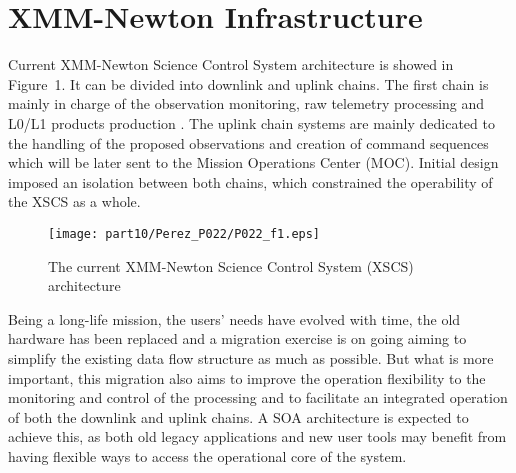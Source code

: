 \section{XMM-Newton Infrastructure}
Current XMM-Newton Science Control System architecture is showed in Figure~1. It can be divided into downlink and uplink chains. The first chain is mainly in charge of the observation monitoring, raw telemetry processing and L0/L1 products production \citep{vallejo11}. The uplink chain systems are mainly dedicated to the handling of the proposed observations and creation of command sequences which will be later sent to the Mission Operations Center (MOC). Initial design imposed an isolation between both chains, which constrained the operability of the XSCS as a whole. 
\begin{figure}[ht]
\centering
\texttt{[image: part10/Perez\_P022/P022\_f1.eps]}
\caption{The current XMM-Newton Science Control System (XSCS) architecture}
\label{fig:1}
\end{figure}
Being a long-life mission, the users' needs have evolved with time, the old hardware has been replaced and a migration exercise is on going aiming to simplify the existing data flow structure as much as possible. But what is more important, this migration also aims to improve the operation flexibility to the monitoring and control of the processing and to facilitate an integrated operation of both the downlink and uplink chains. A SOA architecture is expected to achieve this, as both old legacy applications and new user tools may benefit from having flexible ways to access the operational core of the system. 

